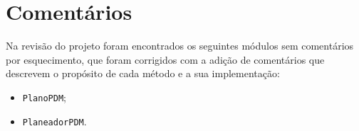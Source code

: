 \section{Comentários}\label{sec:comentarios}

Na revisão do projeto foram encontrados os seguintes módulos sem comentários por esquecimento, que foram corrigidos com a adição de comentários que descrevem o propósito de cada método e a sua implementação:

\begin{itemize}
    \item \texttt{PlanoPDM};
    \item \texttt{PlaneadorPDM}.
\end{itemize}
